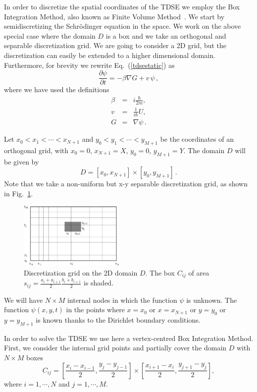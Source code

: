 \documentclass[a4paper,11pt]{article}
\begin{document}
In order to discretize the spatial coordinates of the TDSE we employ
the Box Integration Method, also known as Finite Volume Method~\cite{eymardBOOK}.
We start by semidiscretizing the Schr\"{o}dinger equation in the space.
We work on the above special case where the domain $D$ is a box and we take
an orthogonal and separable discretization grid.
We are going to consider a 2D grid, but the discretization can easily be
extended to a higher dimensional domain.
Furthermore, for brevity we rewrite Eq.~(\ref{tdsestatic}) as
\begin{equation} \label{tdsenoconst}
\frac{\partial \psi}{\partial t} = -\beta \nabla G + v \, \psi \, ,
\end{equation}
where we have used the definitions
\begin{eqnarray}
\beta &=& i \frac{\hbar}{2m} , \\
v &=& \frac{1}{i \hbar} U , \\
G &=& \nabla \psi \, .
\end{eqnarray}

Let $ x_0 < x_1 < \cdots < x_{N+1} $ and $ y_0 < y_1 < \cdots < y_{M+1} $ be the coordinates of an
orthogonal grid, with $x_0=0$, $x_{N+1}=X$, $y_0=0$, $y_{M+1}=Y$.
The domain $D$ will be given by
\begin{equation}
D = [x_0, x_{N+1}] \times [y_0, y_{M+1}] \, .
\end{equation}
Note that we take a non-uniform but x-y separable discretization grid, as shown in Fig.~\ref{fig:bimgrid}. 

\begin{figure}
\centerline{\includegraphics[width=2in] {bmgrid} }
\caption{Discretization grid on the 2D domain $D$.  The box $C_{ij}$ of area
$s_{ij}=\frac{a_i+a_{i+1}}{2} \frac{b_i+b_{i+1}}{2}$ is shaded.}
\label{fig:bimgrid}
\end{figure}

We will have $N \times M$ internal nodes in which the function $\psi$ is unknown.
The function $\psi(x, y, t)$ in the points where $x = x_0$ or $x = x_{N+1}$ or $y = y_0$ or $y = y_{M+1}$
is known thanks to the Dirichlet boundary conditions.

In order to solve the TDSE we use here a vertex-centred Box Integration Method.
First, we consider the internal grid points and partially cover the domain $D$
with $N \times M$ boxes 
\begin{equation}
C_{ij} = [\frac{x_i - x_{i-1}}{2}, \frac{y_j - y_{j-1}}{2}] \times
                [\frac{x_{i+1} - x_i}{2}, \frac{y_{j+1} - y_j}{2}] ,
\end{equation}
where $i = 1, \cdots, N$ and $j = 1, \cdots, M$.
\end{document}
